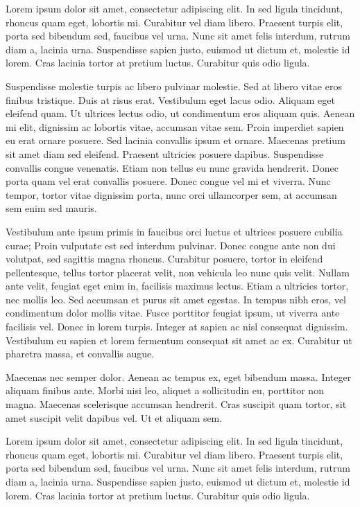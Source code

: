 Lorem ipsum dolor sit amet, consectetur adipiscing elit. In sed ligula tincidunt, rhoncus quam eget, lobortis mi. Curabitur vel diam libero. Praesent turpis elit, porta sed bibendum sed, faucibus vel urna. Nunc sit amet felis interdum, rutrum diam a, lacinia urna. Suspendisse sapien justo, euismod ut dictum et, molestie id lorem. Cras lacinia tortor at pretium luctus. Curabitur quis odio ligula.

Suspendisse molestie turpis ac libero pulvinar molestie. Sed at libero vitae eros finibus tristique. Duis at risus erat. Vestibulum eget lacus odio. Aliquam eget eleifend quam. Ut ultrices lectus odio, ut condimentum eros aliquam quis. Aenean mi elit, dignissim ac lobortis vitae, accumsan vitae sem. Proin imperdiet sapien eu erat ornare posuere. Sed lacinia convallis ipsum et ornare. Maecenas pretium sit amet diam sed eleifend. Praesent ultricies posuere dapibus. Suspendisse convallis congue venenatis. Etiam non tellus eu nunc gravida hendrerit. Donec porta quam vel erat convallis posuere. Donec congue vel mi et viverra. Nunc tempor, tortor vitae dignissim porta, nunc orci ullamcorper sem, at accumsan sem enim sed mauris. 

Vestibulum ante ipsum primis in faucibus orci luctus et ultrices posuere cubilia curae; Proin vulputate est sed interdum pulvinar. Donec congue ante non dui volutpat, sed sagittis magna rhoncus. Curabitur posuere, tortor in eleifend pellentesque, tellus tortor placerat velit, non vehicula leo nunc quis velit. Nullam ante velit, feugiat eget enim in, facilisis maximus lectus. Etiam a ultricies tortor, nec mollis leo. Sed accumsan et purus sit amet egestas. In tempus nibh eros, vel condimentum dolor mollis vitae. Fusce porttitor feugiat ipsum, ut viverra ante facilisis vel. Donec in lorem turpis. Integer at sapien ac nisl consequat dignissim. Vestibulum eu sapien et lorem fermentum consequat sit amet ac ex. Curabitur ut pharetra massa, et convallis augue.

Maecenas nec semper dolor. Aenean ac tempus ex, eget bibendum massa. Integer aliquam finibus ante. Morbi nisi leo, aliquet a sollicitudin eu, porttitor non magna. Maecenas scelerisque accumsan hendrerit. Cras suscipit quam tortor, sit amet suscipit velit dapibus vel. Ut et aliquam sem.

Lorem ipsum dolor sit amet, consectetur adipiscing elit. In sed ligula tincidunt, rhoncus quam eget, lobortis mi. Curabitur vel diam libero. Praesent turpis elit, porta sed bibendum sed, faucibus vel urna. Nunc sit amet felis interdum, rutrum diam a, lacinia urna. Suspendisse sapien justo, euismod ut dictum et, molestie id lorem. Cras lacinia tortor at pretium luctus. Curabitur quis odio ligula.

